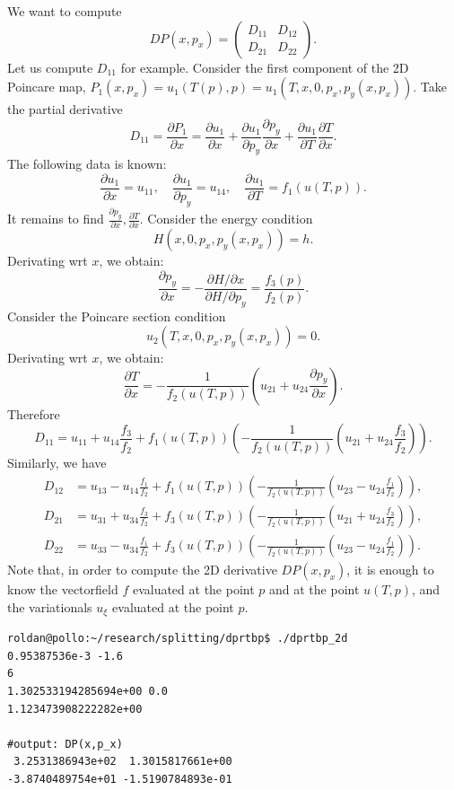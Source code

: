 \documentclass[a4paper]{amsart}
\theoremstyle{remark}
\begin{document}
We want to compute
\[ DP(x,p_x) = 
\begin{pmatrix}
D_{11} & D_{12} \\
D_{21} & D_{22}
\end{pmatrix}.
\]
Let us compute $D_{11}$ for example. Consider the first component of the 2D
Poincare map, $P_1(x,p_x) = u_1(T(p),p) = u_1(T,x,0,p_x,p_y(x,p_x))$. Take
the partial derivative
\[ D_{11} = \frac{\partial P_1}{\partial x} = 
\frac{\partial u_1}{\partial x} + 
\frac{\partial u_1}{\partial p_y} \frac{\partial p_y}{\partial x} +
\frac{\partial u_1}{\partial T} \frac{\partial T}{\partial x}.
\]
The following data is known:
\[
\frac{\partial u_1}{\partial x} = u_{11}, \quad
\frac{\partial u_1}{\partial p_y} = u_{14}, \quad
\frac{\partial u_1}{\partial T} = f_1(u(T,p)).
\]
It remains to find $\frac{\partial p_y}{\partial x}, \frac{\partial
T}{\partial x}$. Consider the energy condition
\[ H(x,0,p_x,p_y(x,p_x)) = h. \]
Derivating wrt $x$, we obtain:
\[ \frac{\partial p_y}{\partial x} = 
-\frac{\partial H/\partial x}{\partial H/\partial p_y} = 
\frac{f_3(p)}{f_2(p)}. \]
Consider the Poincare section condition
\[ u_2(T,x,0,p_x,p_y(x,p_x)) = 0. \]
Derivating wrt $x$, we obtain:
\[ \frac{\partial T}{\partial x} = -\frac{1}{f_2(u(T,p))} 
\left( u_{21} + u_{24} \frac{\partial p_y}{\partial x} \right).
\]
Therefore 
\[ D_{11} =
u_{11} + u_{14} \frac{f_3}{f_2} + f_1(u(T,p)) 
\left( -\frac{1}{f_2(u(T,p))}\left( u_{21} + u_{24} \frac{f_3}{f_2} \right) \right).
\]
Similarly, we have
\begin{align*} 
D_{12} &= u_{13} - u_{14} \frac{f_1}{f_2} + f_1(u(T,p))
\left( -\frac{1}{f_2(u(T,p))}\left( u_{23} - u_{24} \frac{f_1}{f_2} \right) \right),\\
D_{21} &= u_{31} + u_{34} \frac{f_3}{f_2} + f_3(u(T,p))
\left( -\frac{1}{f_2(u(T,p))}\left( u_{21} + u_{24} \frac{f_3}{f_2} \right)
\right),\\
D_{22} &= u_{33} - u_{34} \frac{f_1}{f_2} + f_3(u(T,p))
\left( -\frac{1}{f_2(u(T,p))}\left( u_{23} - u_{24} \frac{f_1}{f_2} \right) \right).
\end{align*}
Note that, in order to compute the 2D derivative $DP(x,p_x)$, it is enough to
know the vectorfield $f$ evaluated at the point $p$ and at the point
$u(T,p)$, and the variationals $u_\xi$ evaluated at the point $p$.

\begin{verbatim}
roldan@pollo:~/research/splitting/dprtbp$ ./dprtbp_2d
0.95387536e-3 -1.6 
6 
1.302533194285694e+00 0.0 
1.123473908222282e+00

#output: DP(x,p_x)
 3.2531386943e+02  1.3015817661e+00
-3.8740489754e+01 -1.5190784893e-01
\end{verbatim}
\end{document}
